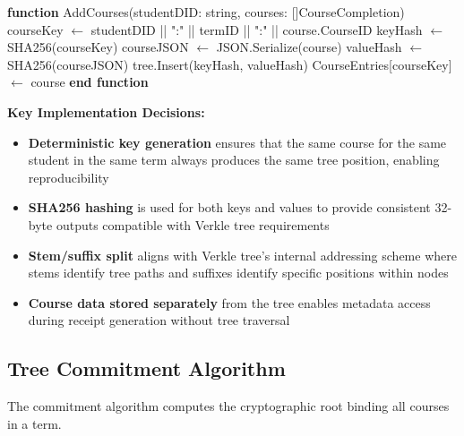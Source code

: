 \begin{algorithm}[H]
\caption{AddCourses - Insert Student Courses into Tree}
\label{alg:add-courses}
\begin{algorithmic}[1]
\STATE \textbf{function} AddCourses(studentDID: string, courses: []CourseCompletion)
    \STATE courseKey $\leftarrow$ studentDID || ":" || termID || ":" || course.CourseID
    \STATE {}
    \STATE
    \STATE keyHash $\leftarrow$ SHA256(courseKey)
    \STATE {}
    \STATE
    \STATE courseJSON $\leftarrow$ JSON.Serialize(course)
    \STATE valueHash $\leftarrow$ SHA256(courseJSON)
    \STATE
    \STATE tree.Insert(keyHash, valueHash)
    \STATE {}
    \STATE
    \STATE CourseEntries[courseKey] $\leftarrow$ course
    \STATE {}
\ENDFOR
\STATE \textbf{end function}
\end{algorithmic}
\end{algorithm}

\textbf{Key Implementation Decisions:}
\begin{itemize}
    \item \textbf{Deterministic key generation} ensures that the same course for the same student in the same term always produces the same tree position, enabling reproducibility
    \item \textbf{SHA256 hashing} is used for both keys and values to provide consistent 32-byte outputs compatible with Verkle tree requirements
    \item \textbf{Stem/suffix split} aligns with Verkle tree's internal addressing scheme where stems identify tree paths and suffixes identify specific positions within nodes
    \item \textbf{Course data stored separately} from the tree enables metadata access during receipt generation without tree traversal
\end{itemize}

\subsection{Tree Commitment Algorithm}
\label{subsec:tree-commitment-algo}

The commitment algorithm computes the cryptographic root binding all courses in a term.

